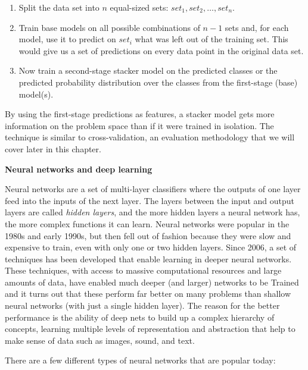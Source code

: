 \documentclass[]{krantz}
\begin{document}
\begin{enumerate}
\def\labelenumi{\arabic{enumi}.}
\item
  Split the data set into \(n\) equal-sized sets:
  \(set_1, set_2,\ldots,set_n\).
\item
  Train base models on all possible combinations of \(n-1\) sets and,
  for each model, use it to predict on \(set_i\) what was left out of
  the training set. This would give us a set of predictions on every
  data point in the original data set.
\item
  Now train a second-stage stacker model on the predicted classes or the
  predicted probability distribution over the classes from the
  first-stage (base) model(s).
\end{enumerate}

By using the first-stage predictions as features, a stacker model gets
more information on the problem space than if it were trained in
isolation. The technique is similar to cross-validation, an evaluation
methodology that we will cover later in this chapter.

\textbf{Neural networks and deep learning}

Neural networks are a set of multi-layer classifiers where the outputs
of one layer feed into the inputs of the next layer. The layers between
the input and output layers are called \emph{hidden layers}, and the
more hidden layers a neural network has, the more complex functions it
can learn. Neural networks were popular in the 1980s and early 1990s,
but then fell out of fashion because they were slow and expensive to
train, even with only one or two hidden layers. Since 2006, a set of
techniques has been developed that enable learning in deeper neural
networks. These techniques, with access to massive computational
resources and large amounts of data, have enabled much deeper (and
larger) networks to be Trained and it turns out that these perform far
better on many problems than shallow neural networks (with just a single
hidden layer). The reason for the better performance is the ability of
deep nets to build up a complex hierarchy of concepts, learning multiple
levels of representation and abstraction that help to make sense of data
such as images, sound, and text.

There are a few different types of neural networks that are popular
today:
\end{document}
